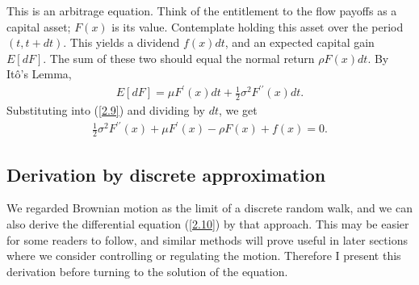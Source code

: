 \documentclass[12pt]{article}
\theoremstyle{definition}
\begin{document}
This is an arbitrage equation. Think of the entitlement to the flow payoffs as a capital asset; $F(x)$ is its value. Contemplate holding this asset over the period $(t, t+d t)$. This yields a dividend $f(x) d t$, and an expected capital gain $E[d F]$. The sum of these two should equal the normal return $\rho F(x) d t$.
By Itô's Lemma,
\begin{align*}
E[d F]=\mu F^{\prime}(x) dt+\frac{1}{2} \sigma^{2} F^{\prime \prime}(x) dt.
\end{align*}
Substituting into (\ref{2.9}) and dividing by $dt$, we get
\begin{align}
\frac{1}{2} \sigma^{2} F^{\prime \prime}(x)+\mu F^{\prime}(x)-\rho F(x)+f(x)=0 . \label{2.10}
\end{align}

\subsection{Derivation by discrete approximation}
We regarded Brownian motion as the limit of a discrete random walk, and we can also derive the differential equation (\ref{2.10}) by that approach. This may be easier for some readers to follow, and similar methods will prove useful in later sections where we consider controlling or regulating the motion. Therefore I present this derivation before turning to the solution of the equation.
\end{document}
